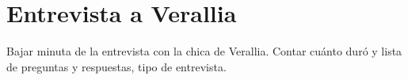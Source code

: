 \chapter{Entrevista a Verallia}
\label{cp:verallia-interview}

\parindent0pt

Bajar minuta de la entrevista con la chica de Verallia. Contar cuánto duró y lista de preguntas y respuestas, tipo de entrevista.
